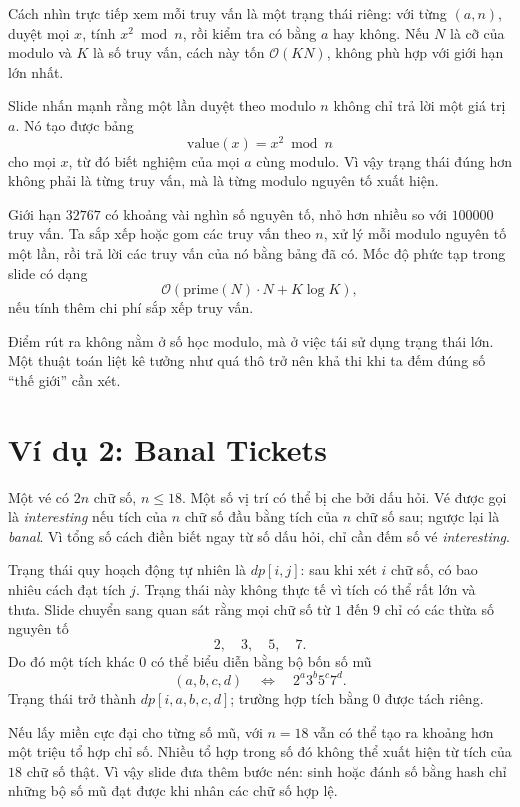 \documentclass[11pt]{article}
\newcommand{\Oh}{\mathcal{O}}
\begin{document}
Cách nhìn trực tiếp xem mỗi truy vấn là một trạng thái riêng: với từng
\((a,n)\), duyệt mọi \(x\), tính \(x^2\bmod n\), rồi kiểm tra có bằng \(a\)
hay không. Nếu \(N\) là cỡ của modulo và \(K\) là số truy vấn, cách này tốn
\(\Oh(KN)\), không phù hợp với giới hạn lớn nhất.

Slide nhấn mạnh rằng một lần duyệt theo modulo \(n\) không chỉ trả lời một
giá trị \(a\). Nó tạo được bảng
\[
  \text{value}(x)=x^2\bmod n
\]
cho mọi \(x\), từ đó biết nghiệm của mọi \(a\) cùng modulo. Vì vậy trạng thái
đúng hơn không phải là từng truy vấn, mà là từng modulo nguyên tố xuất hiện.

Giới hạn \(32767\) có khoảng vài nghìn số nguyên tố, nhỏ hơn nhiều so với
\(100000\) truy vấn. Ta sắp xếp hoặc gom các truy vấn theo \(n\), xử lý mỗi
modulo nguyên tố một lần, rồi trả lời các truy vấn của nó bằng bảng đã có.
Mốc độ phức tạp trong slide có dạng
\[
  \Oh(\text{prime}(N)\cdot N + K\log K),
\]
nếu tính thêm chi phí sắp xếp truy vấn.

Điểm rút ra không nằm ở số học modulo, mà ở việc tái sử dụng trạng thái lớn.
Một thuật toán liệt kê tưởng như quá thô trở nên khả thi khi ta đếm đúng số
``thế giới'' cần xét.

\section{Ví dụ 2: Banal Tickets}

Một vé có \(2n\) chữ số, \(n\le 18\). Một số vị trí có thể bị che bởi dấu hỏi.
Vé được gọi là \emph{interesting} nếu tích của \(n\) chữ số đầu bằng tích của
\(n\) chữ số sau; ngược lại là \emph{banal}. Vì tổng số cách điền biết ngay từ
số dấu hỏi, chỉ cần đếm số vé \emph{interesting}.

Trạng thái quy hoạch động tự nhiên là \(dp[i,j]\): sau khi xét \(i\) chữ số,
có bao nhiêu cách đạt tích \(j\). Trạng thái này không thực tế vì tích có thể
rất lớn và thưa. Slide chuyển sang quan sát rằng mọi chữ số từ \(1\) đến \(9\)
chỉ có các thừa số nguyên tố
\[
  2,\quad 3,\quad 5,\quad 7.
\]
Do đó một tích khác \(0\) có thể biểu diễn bằng bộ bốn số mũ
\[
  (a,b,c,d)
  \quad\Longleftrightarrow\quad
  2^a3^b5^c7^d.
\]
Trạng thái trở thành \(dp[i,a,b,c,d]\); trường hợp tích bằng \(0\) được tách
riêng.

Nếu lấy miền cực đại cho từng số mũ, với \(n=18\) vẫn có thể tạo ra khoảng
hơn một triệu tổ hợp chỉ số. Nhiều tổ hợp trong số đó không thể xuất hiện từ
tích của \(18\) chữ số thật. Vì vậy slide đưa thêm bước nén: sinh hoặc đánh
số bằng hash chỉ những bộ số mũ đạt được khi nhân các chữ số hợp lệ.
\end{document}
